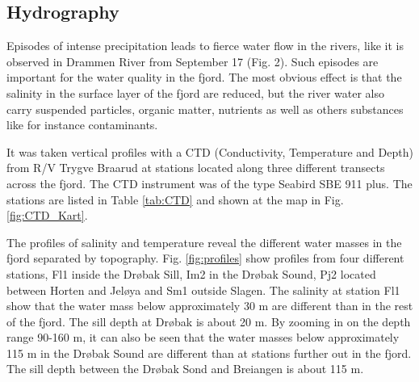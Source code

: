 \documentclass[12pt,a4paper,english]{article}
\begin{document}
\clearpage

\subsection{Hydrography}
Episodes of intense precipitation leads to fierce water flow in the rivers, 
like it is observed in Drammen River from September 17 (Fig. 2). %
Such episodes are important for the water quality in the fjord. 
The most obvious effect is that the salinity in the surface layer of the fjord 
are reduced, but the river water also carry suspended particles, organic matter, 
nutrients as well as others substances like for instance contaminants.       

It was taken vertical profiles with a CTD (Conductivity, Temperature and Depth)
from R/V Trygve Braarud 
at stations located along three different transects across the fjord. 
The CTD instrument was of the type Seabird SBE 911 plus.
The stations are listed in Table \ref{tab:CTD} and shown at the map in 
Fig. \ref{fig:CTD_Kart}. 

The profiles of salinity and temperature reveal the different water masses in 
the fjord separated by topography. Fig. \ref{fig:profiles} show profiles from 
four different stations, Fl1 inside the Dr{\o}bak Sill, Im2 in the Dr{\o}bak Sound, 
Pj2 located between Horten and Jel{\o}ya and Sm1 outside Slagen. 
The salinity at station Fl1 show that the water mass below approximately 30 m 
are different than in the rest of the fjord. 
The sill depth at Dr{\o}bak is about 20 m. 
By zooming in on the depth range 90-160 m, it can also be seen that the water 
masses below approximately 115 m in the Dr{\o}bak Sound are different than at 
stations further out in the fjord. The sill depth between the Dr{\o}bak Sond and 
Breiangen is about 115 m. 
\end{document}

